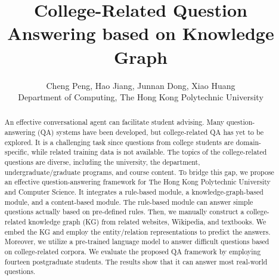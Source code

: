 \documentclass[11pt]{article}
\begin{document}
\title{College-Related Question Answering based on Knowledge Graph}
\author{Cheng Peng,  Hao Jiang, Junnan Dong, Xiao Huang\\
Department of Computing, The Hong Kong Polytechnic University
}

\maketitle

\begin{abstract}
An effective conversational agent can facilitate student advising. Many question-answering (QA) systems have been developed, but college-related QA has yet to be explored. It is a challenging task since questions from college students are domain-specific, while related training data is not available. The topics of the college-related questions are diverse, including the university, the department, undergraduate/graduate programs, and course content. To bridge this gap, we propose an effective question-answering framework for The Hong Kong Polytechnic University and Computer Science. It integrates a rule-based module, a knowledge-graph-based module, and a content-based module. The rule-based module can answer simple questions actually based on pre-defined rules. Then, we manually construct a college-related knowledge graph (KG) from related websites, Wikipedia, and textbooks. We embed the KG and employ the entity/relation representations to predict the answers. Moreover, we utilize a pre-trained language model to answer difficult questions based on college-related corpora. We evaluate the proposed QA framework by employing fourteen postgraduate students. The results show that it can answer most real-world questions.
\end{abstract}
\end{document}
